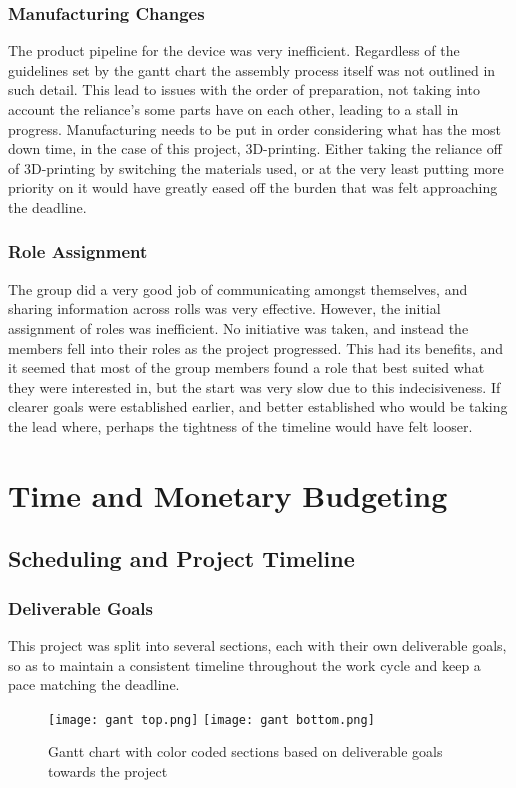 \documentclass[12pt]{article}
\begin{document}
\subsubsection{Manufacturing Changes}
The product pipeline for the device was very inefficient. Regardless of the guidelines set by the gantt chart the assembly process itself was not outlined in such detail. This lead to issues with the order of preparation, not taking into account the reliance's some parts have on each other, leading to a stall in progress. Manufacturing needs to be put in order considering what has the most down time, in the case of this project, 3D-printing. Either taking the reliance off of 3D-printing by switching the materials used, or at the very least putting more priority on it would have greatly eased off the burden that was felt approaching the deadline.

\subsubsection{Role Assignment}
The group did a very good job of communicating amongst themselves, and sharing information across rolls was very effective. However, the initial assignment of roles was inefficient. No initiative was taken, and instead the members fell into their roles as the project progressed. This had its benefits, and it seemed that most of the group members found a role that best suited what they were interested in, but the start was very slow due to this indecisiveness. If clearer goals were established earlier, and better established who would be taking the lead where, perhaps the tightness of the timeline would have felt looser.


\newpage
\section{Time and Monetary Budgeting}

\subsection{Scheduling and Project Timeline}

\subsubsection{Deliverable Goals}
This project was split into several sections, each with their own deliverable goals, so as to maintain a consistent timeline throughout the work cycle and keep a pace matching the deadline.
\begin{figure}[H]
\centering
    \texttt{[image: gant top.png]}
    \texttt{[image: gant bottom.png]}
    \caption{Gantt chart with color coded sections based on deliverable goals towards the project}
    \label{fig:sub2}
\end{figure}
\newpage 
\end{document}
